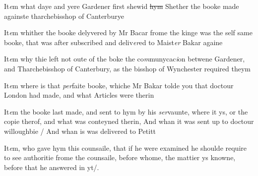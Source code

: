 \documentclass[12pt, a4paper]{book}
\begin{document}
				\marginpar[\vspace{0.5cm}{\textcolor{Gray}{27}}]{}
			
		\ifthenelse{\isodd{\thepage}}
		{\reversemarginpar}
		{\normalmarginpar}
		It\textit{e}m what daye and yere Gardener first shewid \sout{hym}
               Shether
			 the booke
made againste tharchebisshop  of Canterburye

				\marginpar[\vspace{0.5cm}{\textcolor{Gray}{28}}]{}
			
		\ifthenelse{\isodd{\thepage}}
		{\reversemarginpar}
		{\normalmarginpar}
		It\textit{e}m whither the booke delyvered by Mr Bacar frome the kinge
was the self same booke, that was after subscribed and deliv\textit{er}ed
to Maist\textit{er} Bakar againe
 	
				\marginpar[\vspace{0.5cm}{\textcolor{Gray}{29}}]{}
			
		\ifthenelse{\isodd{\thepage}}
		{\reversemarginpar}
		{\normalmarginpar}
		It\textit{e}m why thie left not oute of the boke the co\textit{m}munycac\textit{i}on betwene 
Gardener, and Tharchebisshop  of Canterbury, as the bisshop
of Wynchester required theym

				\marginpar[\vspace{0.5cm}{\textcolor{Gray}{30}}]{}
			
		\ifthenelse{\isodd{\thepage}}
		{\reversemarginpar}
		{\normalmarginpar}
		It\textit{e}m where is that \textit{per}faite booke, whiche Mr Bakar tolde you
that doctour London had made, and what Articles were therin

				\marginpar[\vspace{0.5cm}{\textcolor{Gray}{31}}]{}
			
		\ifthenelse{\isodd{\thepage}}
		{\reversemarginpar}
		{\normalmarginpar}
		It\textit{e}m the booke last made, and sent to hym by his \textit{ser}vaunte, where
it ys, or the copie therof, and what was conteyned therin, And 
whan it was sent up to doctour willoughbie / And whan is was 
delivered to Petitt

				\marginpar[\vspace{0.5cm}{\textcolor{Gray}{32}}]{}
			
		\ifthenelse{\isodd{\thepage}}
		{\reversemarginpar}
		{\normalmarginpar}
		It\textit{e}m, who gave hym this counsaile, that if he were examined
he shoulde require to see authoritie frome the counsaile, before
whome, the mattier ys knowne, before that he answered in yt/.
\end{document}
